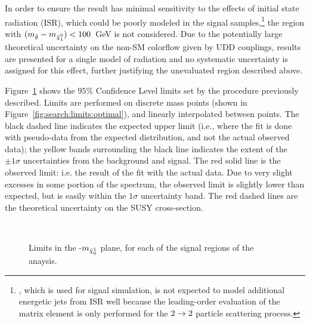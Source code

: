 In order to ensure the result has minimal sensitivity to the effects of initial state radiation (ISR), which could be poorly modeled in the signal samples,\footnote{\Herwigpp, which is used for signal simulation, is not expected to model additional energetic jets from ISR well because the leading-order evaluation of the matrix element is only performed for the $2\rightarrow2$ particle scattering process.} the region with $(\mgluino-\mninoone)<100$~GeV is not considered. Due to the potentially large theoretical uncertainty on the non-SM colorflow given by UDD couplings, results are presented for a single model of radiation and no systematic uncertainty is assigned for this effect, further justifying the unevaluated region described above. 


Figure~\ref{fig:search:limits:srs} shows the $95\%$ Confidence Level limits set by the \CLs procedure previously described. Limits are performed on discrete mass points (shown in Figure~\ref{fig:search:limits:optimal}), and linearly interpolated between points. The black dashed line indicates the expected upper limit (i.e., where the fit is done with pseudo-data from the expected distribution, and not the actual observed data); the yellow bands surrounding the black line indicates the extent of the $\pm 1\sigma$ uncertainties from the background and signal. The red solid line is the observed limit: i.e. the result of the fit with the actual data. Due to very slight excesses in some portion of the spectrum, the observed limit is slightly lower than expected, but is easily within the $1\sigma$ uncertainty band. The red dashed lines are the theoretical uncertainty on the SUSY cross-section.

\begin{figure}[!ht]
  \centering
  
  \\
    
  \caption{Limits in the \mgluino-$m_{\tilde{\chi}_0^1}$ plane, for each of the signal regions of the anaysis.} 
               
  \label{fig:search:limits:srs}
\end{figure}


